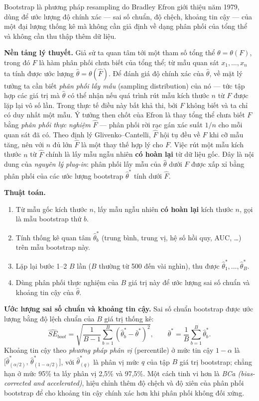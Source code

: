 \documentclass[14pt,a4paper]{extarticle}\usepackage[]{graphicx}\usepackage[]{xcolor}
\begin{document}
Bootstrap là phương pháp resampling do Bradley Efron giới thiệu năm 1979,
dùng để ước lượng độ chính xác --- sai số chuẩn, độ chệch, khoảng tin cậy
--- của một đại lượng thống kê mà không cần giả định về dạng phân phối của
tổng thể và không cần thu thập thêm dữ liệu.

\textbf{Nền tảng lý thuyết.} Giả sử ta quan tâm tới một tham số tổng thể
$\theta = \theta(F)$, trong đó $F$ là hàm phân phối chưa biết của tổng
thể; từ mẫu quan sát $x_1, \ldots, x_n$ ta tính được ước lượng
$\hat{\theta} = \theta(\hat{F})$. Để đánh giá độ chính xác của
$\hat{\theta}$, về mặt lý tưởng ta cần biết \emph{phân phối lấy mẫu}
(sampling distribution) của nó --- tức tập hợp các giá trị mà
$\hat{\theta}$ có thể nhận nếu quá trình rút mẫu kích thước $n$ từ $F$
được lặp lại vô số lần. Trong thực tế điều này bất khả thi, bởi $F$ không
biết và ta chỉ có duy nhất một mẫu. Ý tưởng then chốt của Efron là thay
tổng thể chưa biết $F$ bằng \emph{phân phối thực nghiệm} $\hat{F}$ ---
phân phối rời rạc gán xác suất $1/n$ cho mỗi quan sát đã có. Theo định lý
Glivenko--Cantelli, $\hat{F}$ hội tụ đều về $F$ khi cỡ mẫu tăng, nên với
$n$ đủ lớn $\hat{F}$ là một thay thế hợp lý cho $F$. Việc rút một mẫu kích
thước $n$ từ $\hat{F}$ chính là lấy mẫu ngẫu nhiên \textbf{có hoàn lại} từ
dữ liệu gốc. Đây là nội dung của \emph{nguyên lý plug-in}: phân phối lấy
mẫu của $\hat{\theta}$ dưới $F$ được xấp xỉ bằng phân phối của các ước
lượng bootstrap $\hat{\theta}^{*}$ tính dưới $\hat{F}$.

\textbf{Thuật toán.}
\begin{enumerate}
  \item Từ mẫu gốc kích thước $n$, lấy mẫu ngẫu nhiên \textbf{có hoàn lại}
        kích thước $n$, gọi là mẫu bootstrap thứ $b$.
  \item Tính thống kê quan tâm $\hat{\theta}^{*}_{b}$ (trung bình, trung
        vị, hệ số hồi quy, AUC, \ldots) trên mẫu bootstrap này.
  \item Lặp lại bước 1--2 $B$ lần ($B$ thường từ 500 đến vài nghìn), thu
        được $\hat{\theta}^{*}_{1}, \ldots, \hat{\theta}^{*}_{B}$.
  \item Dùng phân phối thực nghiệm của $B$ giá trị này để ước lượng sai số
        chuẩn và khoảng tin cậy của $\hat{\theta}$.
\end{enumerate}

\textbf{Ước lượng sai số chuẩn và khoảng tin cậy.} Sai số chuẩn bootstrap
được ước lượng bằng độ lệch chuẩn của $B$ giá trị thống kê:
\[
  \widehat{SE}_{boot} = \sqrt{\frac{1}{B-1}\sum_{b=1}^{B}
  \left(\hat{\theta}^{*}_{b} - \bar{\theta}^{*}\right)^2}, \qquad
  \bar{\theta}^{*} = \frac{1}{B}\sum_{b=1}^{B}\hat{\theta}^{*}_{b}.
\]
Khoảng tin cậy theo \emph{phương pháp phân vị} (percentile) ở mức tin cậy
$1-\alpha$ là $\big[\hat{\theta}^{*}_{(\alpha/2)},\,
\hat{\theta}^{*}_{(1-\alpha/2)}\big]$, với $\hat{\theta}^{*}_{(q)}$ là
phân vị mức $q$ của tập $B$ giá trị bootstrap; chẳng hạn ở mức 95\% ta lấy
phân vị 2,5\% và 97,5\%. Một cách tinh vi hơn là \emph{BCa
(bias-corrected and accelerated)}, hiệu chỉnh thêm độ chệch và độ xiên
của phân phối bootstrap để cho khoảng tin cậy chính xác hơn khi phân phối
không đối xứng.
\end{document}
